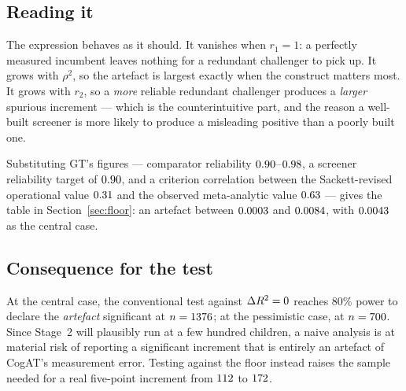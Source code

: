 \subsection{Reading it}

The expression behaves as it should. It vanishes when $r_1=1$: a perfectly
measured incumbent leaves nothing for a redundant challenger to pick up. It
grows with $\rho^2$, so the artefact is largest exactly when the construct
matters most. It grows with $r_2$, so a \emph{more} reliable redundant
challenger produces a \emph{larger} spurious increment --- which is the
counterintuitive part, and the reason a well-built screener is more likely to
produce a misleading positive than a poorly built one.

Substituting GT's figures --- comparator reliability $0.90$--$0.98$,
a screener reliability target of $0.90$, and a criterion correlation
between the Sackett-revised operational value $0.31$ and the
observed meta-analytic value $0.63$ --- gives the table in
Section~\ref{sec:floor}: an artefact between $0.0003$ and $0.0084$,
with $0.0043$ as the central case.

\subsection{Consequence for the test}

At the central case, the conventional test against $\Delta R^{2}=0$ reaches 80\% power to
declare the \emph{artefact} significant at $n=1376$; at the
pessimistic case, at $n=700$. Since Stage~2 will plausibly run
at a few hundred children, a naive analysis is at material risk of reporting a
significant increment that is entirely an artefact of CogAT's measurement error.
Testing against the floor instead raises the sample needed for a real
five-point increment from $112$ to $172$.


